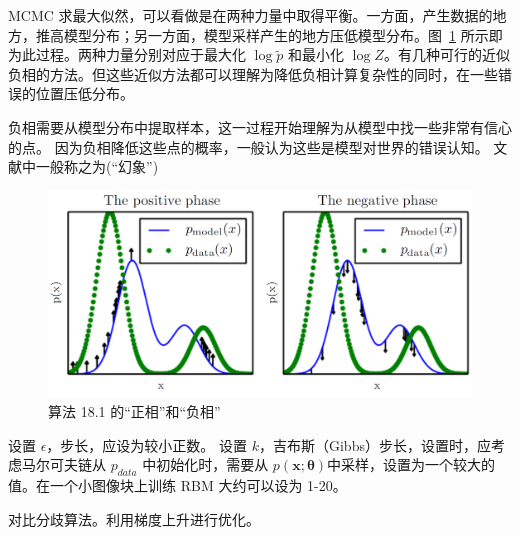 MCMC 求最大似然，可以看做是在两种力量中取得平衡。一方面，产生数据的地方，推高模型分布；另一方面，模型采样产生的地方压低模型分布。图~\ref{fig:18.1} 所示即为此过程。两种力量分别对应于最大化 \(\log\widetilde{p}\) 和最小化 \(\log Z\)。有几种可行的近似负相的方法。但这些近似方法都可以理解为降低负相计算复杂性的同时，在一些错误的位置压低分布。

负相需要从模型分布中提取样本，这一过程开始理解为从模型中找一些非常有信心的点。
因为负相降低这些点的概率，一般认为这些是模型对世界的错误认知。
文献中一般称之为\consider(``幻象'')

\begin{figure}[htbp] %
   \centering
   \includegraphics[width=\textwidth]{fig/chap18/18_1.png} 
   \caption{算法 18.1 的``正相''和``负相''}
   \label{fig:18.1}
\end{figure}

\begin{algorithm}
\DontPrintSemicolon
设置 \(\epsilon\)，步长，应设为较小正数。\;
设置 \(k\)，吉布斯（Gibbs）步长，设置时，应考虑马尔可夫链从 \(p_{data}\) 中初始化时，需要从 \(p(\bm{x};\bm{\theta})\)中采样，设置为一个较大的值。在一个小图像块上训练 RBM 大约可以设为 1-20。\;
\caption{对比分歧算法。利用梯度上升进行优化。\label{alg:18.2}}
\end{algorithm}

